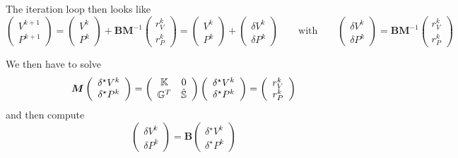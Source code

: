 The iteration loop then looks like
\[
\left(
\begin{array}{c}
V^{k+1} \\ P^{k+1}
\end{array}
\right)
=
\left(
\begin{array}{c}
V^k \\ P^k
\end{array}
\right)
+ 
{\bm B}  {\bm M} ^{-1}
\left(
\begin{array}{c}
r_V^k \\ r_P^k
\end{array}
\right)
=
\left(
\begin{array}{c}
V^k \\ P^k
\end{array}
\right)
+ 
\left(
\begin{array}{c}
\delta V^k \\ \delta P^k
\end{array}
\right)
\quad\quad
\textrm{with}\quad\quad
\left(
\begin{array}{c}
\delta V^k \\ \delta P^k
\end{array}
\right)
=
{\bm B}  {\bm M} ^{-1}
\left(
\begin{array}{c}
r_V^k \\ r_P^k
\end{array}
\right)
\]



We then have to solve 
\begin{equation}
{\bm M} 
\left(
\begin{array}{c}
\delta^\star V^k \\ \delta^\star P^k
\end{array}
\right)
=
\left(
\begin{array}{cc}
{\mathbb{K}} & 0 \\
{\mathbb{G}}^T & \hat{{\mathbb{S}}}
\end{array}
\right)
\left(
\begin{array}{c}
\delta^\star V^k \\ \delta^\star P^k
\end{array}
\right)
=
\left(
\begin{array}{c}
r_V^k \\ r_P^k
\end{array}
\right)
\label{simple1}
\end{equation}
and then compute
\begin{equation}
\left(
\begin{array}{c}
\delta V^k \\ \delta P^k
\end{array}
\right)
=
{\bm B}  
\left(
\begin{array}{c}
\delta^\star V^k \\ \delta^\star P^k
\end{array}
\right)
\label{simple2}
\end{equation}

